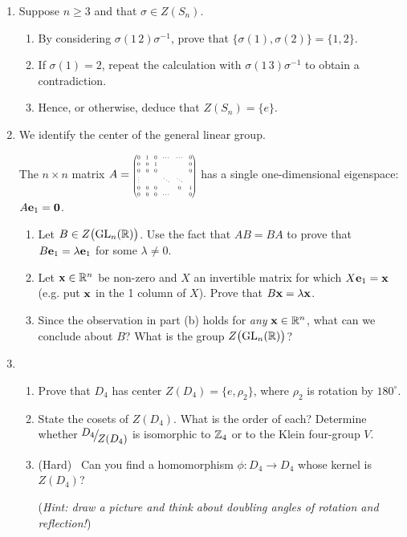 \begin{exercises}{}{}
\begin{enumerate}
		
		\item Suppose $n\ge 3$ and that $\sigma\in Z(S_n)$.
		\begin{enumerate}
		  \item By considering $\sigma(1\,2)\sigma^{-1}$, prove that $\{\sigma(1),\sigma(2)\}=\{1,2\}$.
		  \item If $\sigma(1)=2$, repeat the calculation with $\sigma(1\,3)\sigma^{-1}$ to obtain a contradiction.
		  \item Hence, or otherwise, deduce that $Z(S_n)=\{e\}$.
		\end{enumerate}
		
		
		\item\label{exs:zglnr} We identify the center of the general linear group.\par
		The $n\times n$ matrix $A=\scalebox{0.5}{%
		$\begin{pmatrix}
		  0&1&0&\cdots&\cdots&0\\
		  0&0&1&&&0\\
		  0&0&0&&&0\\
		  \vdots&&&\ddots&\ddots&\\
		  0&0&0&&0&1\\
		  0&0&0&\cdots&&0
		\end{pmatrix}$}$ has a single one-dimensional eigenspace: $A{\mathbf{e}}_1=\mathbf{0}$.
		\begin{enumerate}
		  \item Let $B\in Z\bigl(\mathrm{GL}_n(\mathbb{R})\bigr)$. Use the fact that $AB=BA$ to prove that $B{\mathbf{e}}_1=\lambda{\mathbf{e}}_1$ for some $\lambda\neq 0$.
		  \item Let ${\mathbf{x}}\in\mathbb{R}^n$ be non-zero and $X$ an invertible matrix for which $X{\mathbf{e}}_1={\mathbf{x}}$ (e.g. put ${\mathbf{x}}$ in the 1\st{} column of $X$). Prove that $B{\mathbf{x}}=\lambda{\mathbf{x}}$.
		  \item Since the observation in part (b) holds for \emph{any} ${\mathbf{x}}\in\mathbb{R}^n$, what can we conclude about $B$? What is the group $Z\bigl(\mathrm{GL}_n(\mathbb{R})\bigr)$?
		\end{enumerate}
		
		
		\item\begin{enumerate}
		  \item Prove that $D_4$ has center $Z(D_4)=\{e,\rho_2\}$, where $\rho_2$ is rotation by $180^\circ$.
		  \item State the cosets of $Z(D_4)$. What is the order of each? Determine whether $\quotient{D_4}{Z(D_4)}$ is isomorphic to $\mathbb{Z}_4$ or to the Klein four-group $V$.
		  \item (Hard) \ Can you find a homomorphism $\phi:D_4\to D_4$ whose kernel is $Z(D_4)$?\par
		  (\emph{Hint: draw a picture and think about doubling angles of rotation and reflection!})
		\end{enumerate}
	

\end{enumerate}
\end{exercises}
